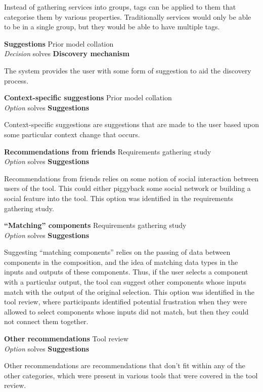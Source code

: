 Instead of gathering services into groups, tags can be applied to them that categorise them by various properties. Traditionally services would only be able to be in a single group, but they would be able to have multiple tags.

\textbf{Suggestions} \hfill Prior model collation \cite{Grammel2010} \\ \emph{Decision} \hfill solves \textbf{Discovery mechanism}

The system provides the user with some form of suggestion to aid the discovery process.

\textbf{Context-specific suggestions} \hfill Prior model collation \cite{Grammel2010} \\ \emph{Option} \hfill solves \textbf{Suggestions}

Context-specific suggestions are suggestions that are made to the user based upon some particular context change that occurs.

\textbf{Recommendations from friends} \hfill Requirements gathering study \\ \emph{Option} \hfill solves \textbf{Suggestions}

Recommendations from friends relies on some notion of social interaction between users of the tool. This could either piggyback some social network or building a social feature into the tool. This option was identified in the requirements gathering study.

\textbf{``Matching'' components} \hfill Requirements gathering study \\ \emph{Option} \hfill solves \textbf{Suggestions}

Suggesting ``matching components'' relies on the passing of data between components in the composition, and the idea of matching data types in the inputs and outputs of these components. Thus, if the user selects a component with a particular output, the tool can suggest other components whose inputs match with the output of the original selection. This option was identified in the tool review, where participants identified potential frustration when they were allowed to select components whose inputs did not match, but then they could not connect them together.

\textbf{Other recommendations} \hfill Tool review \\ \emph{Option} \hfill solves \textbf{Suggestions}

Other recommendations are recommendations that don't fit within any of the other categories, which were present in various tools that were covered in the tool review.

